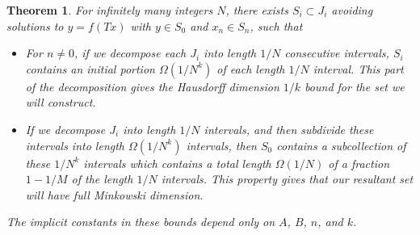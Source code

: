 \documentclass{report}
\theoremstyle{plain}
\theoremstyle{plain}
\newtheorem{theorem}{Theorem}
\begin{document}
\begin{theorem}
    For infinitely many integers $N$, there exists $S_i \subset J_i$ avoiding solutions to $y = f(Tx)$ with $y \in S_0$ and $x_n \in S_n$, such that
    \begin{itemize}
        \item For $n \neq 0$, if we decompose each $J_i$ into length $1/N$ consecutive intervals, $S_i$ contains an initial portion $\Omega(1/N^k)$ of each length $1/N$ interval. This part of the decomposition gives the Hausdorff dimension $1/k$ bound for the set we will construct.

        \item If we decompose $J_i$ into length $1/N$ intervals, and then subdivide these intervals into length $\Omega(1/N^k)$ intervals, then $S_0$ contains a subcollection of these $1/N^k$ intervals which contains a total length $\Omega(1/N)$ of a fraction $1 - 1/M$ of the length $1/N$ intervals. This property gives that our resultant set will have full Minkowski dimension.
    \end{itemize}
    The implicit constants in these bounds depend only on $A$, $B$, $n$, and $k$.
\end{theorem}
\end{document}
